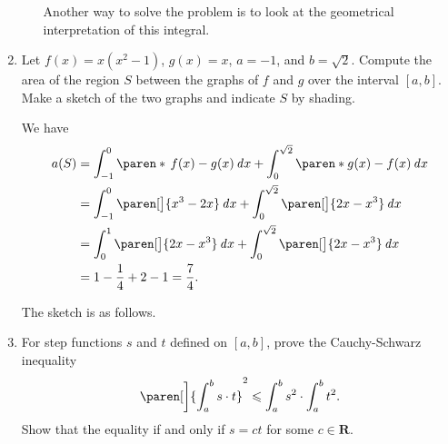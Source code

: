 \documentclass[a4paper]{article}
\begin{document}
\begin{enumerate}
\begin{enumerate}
    Another way to solve the problem is to look at the geometrical
    interpretation of this integral.
  \end{enumerate}

\item Let \(f(x) = x(x^2-1)\), \(g(x) = x\), \(a = -1\), and \(b = \sqrt2\).
  Compute the area of the region \(S\) between the graphs of \(f\) and \(g\)
  over the interval \([a, b]\).  Make a sketch of the two graphs and
  indicate \(S\) by shading.

  We have
  \begin{align*}
    a(S) &= \int_{-1}^0 \paren*{\,f(x) - g(x)} \dx + \int_0^{\sqrt2} \paren*{g(x) - f(x)} \dx \\
         &= \int_{-1}^0 \paren[\big]{x^3 - 2x} \dx + \int_0^{\sqrt2} \paren[\big]{2x-x^3} \dx \\
         &= \int_0^1 \paren[\big]{2x - x^3} \dx + \int_0^{\sqrt2} \paren[\big]{2x-x^3} \dx \\
         &= 1 - \frac14 + 2 - 1 = \frac74.
  \end{align*}

  The sketch is as follows.

  \begin{figure}[H]
    \centering
  \end{figure}

\item For step functions \(s\) and \(t\) defined on \([a, b]\), prove
  the Cauchy-Schwarz inequality
  \[
    \paren[\bigg]{\int_a^b s \cdot t}^2 \le \int_a^b s^2 \cdot \int_a^b t^2.
  \]
  Show that the equality if and only if \(s = ct\) for some
  \(c \in \mathbf{R}\).


\end{enumerate}
\end{document}
